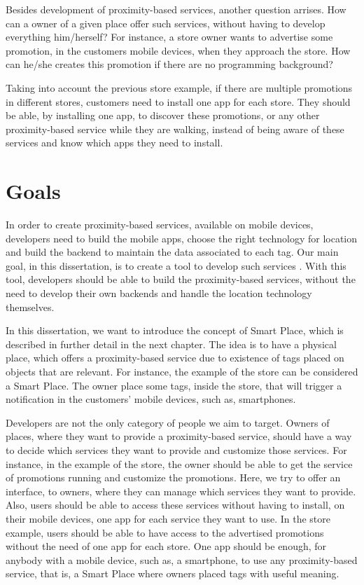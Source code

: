 Besides development of proximity-based services, another question arrises.
How can a owner of a given place offer such services, without having to develop everything him/herself?
For instance, a store owner wants to advertise some promotion, in the customers mobile devices, when they approach the store.
How can he/she creates this promotion if there are no programming background?

Taking into account the previous store example, if there are multiple promotions in different stores, customers need to install one app for each store.
They should be able, by installing one app, to discover these promotions, or any other proximity-based service while they are walking, instead of being aware of these services and know which apps they need to install.

\section{Goals}
\label{sec:introduction_goals}
In order to create proximity-based services, available on mobile devices, developers need to build the mobile apps, choose the right technology for location and build the backend to maintain the data associated to each tag.
Our main goal, in this dissertation, is to create a tool to develop such services%
.
With this tool, developers should be able to build the proximity-based services, without the need to develop their own backends and handle the location technology themselves.

In this dissertation, we want to introduce the concept of Smart Place, which is described in further detail in the next chapter.
The idea is to have a physical place, which offers a proximity-based service due to existence of tags placed on objects that are relevant.
For instance, the example of the store can be considered a Smart Place.
The owner place some tags, inside the store, that will trigger a notification in the customers' mobile devices, such as, smartphones.

Developers are not the only category of people we aim to target.
Owners of places, where they want to provide a proximity-based service, should have a way to decide which services they want to provide and customize those services.
For instance, in the example of the store, the owner should be able to get the service of promotions running and customize the promotions.
Here, we try to offer an interface, to owners, where they can manage which services they want to provide.
Also, users should be able to access these services without having to install, on their mobile devices, one app for each service they want to use.
In the store example, users should be able to have access to the advertised promotions without the need of one app for each store.
One app should be enough, for anybody with a mobile device, such as, a smartphone, to use any proximity-based service, that is, a Smart Place where owners placed tags with useful meaning.

